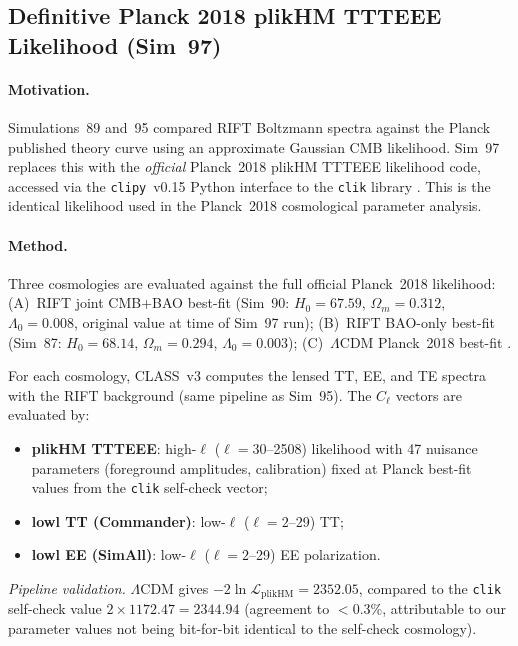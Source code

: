 \documentclass[12pt,a4paper]{article}
\begin{document}
\subsection{Definitive Planck 2018 plikHM TTTEEE Likelihood (Sim~97)}
\label{sec:obs_plikHM}

\paragraph{Motivation.} Simulations~89 and~95 compared RIFT Boltzmann spectra
against the Planck published theory curve using an approximate Gaussian CMB
likelihood.  Sim~97 replaces this with the \emph{official} Planck~2018 plikHM
TTTEEE likelihood code, accessed via the \texttt{clipy}~v0.15 Python interface
to the \texttt{clik} library \citep{Planck2020}.  This is the identical likelihood
used in the Planck~2018 cosmological parameter analysis.

\paragraph{Method.}  Three cosmologies are evaluated against the full official
Planck~2018 likelihood:
(A)~RIFT joint CMB+BAO best-fit (Sim~90: $H_0=67.59$, $\Omega_m=0.312$, $\Lambda_0=0.008$, original value at time of Sim~97 run);
(B)~RIFT BAO-only best-fit (Sim~87: $H_0=68.14$, $\Omega_m=0.294$, $\Lambda_0=0.003$);
(C)~$\Lambda$CDM Planck~2018 best-fit \citep{Planck2020}.

For each cosmology, CLASS~v3 computes the lensed TT, EE, and TE spectra with the
RIFT background (same pipeline as Sim~95).  The $C_\ell$ vectors are evaluated by:
\begin{itemize}
  \item \textbf{plikHM TTTEEE}: high-$\ell$ ($\ell=30$--2508) likelihood with 47
        nuisance parameters (foreground amplitudes, calibration) fixed at Planck best-fit
        values from the \texttt{clik} self-check vector;
  \item \textbf{lowl TT (Commander)}: low-$\ell$ ($\ell=2$--29) TT;
  \item \textbf{lowl EE (SimAll)}: low-$\ell$ ($\ell=2$--29) EE polarization.
\end{itemize}

\emph{Pipeline validation.}
$\Lambda$CDM gives $-2\ln\mathcal{L}_\mathrm{plikHM}=2352.05$, compared to the
\texttt{clik} self-check value $2\times 1172.47 = 2344.94$ (agreement to $<0.3\%$,
attributable to our parameter values not being bit-for-bit identical to the
self-check cosmology).
\end{document}
